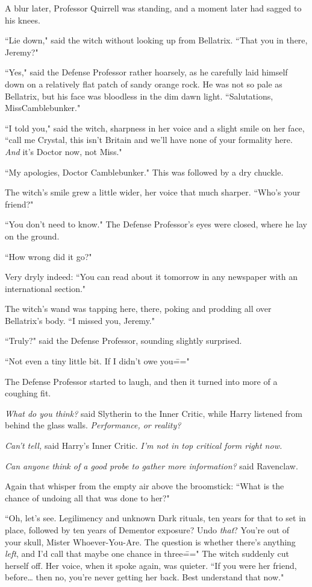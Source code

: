 A blur later, Professor Quirrell was standing, and a moment later had sagged to his knees.

``Lie down," said the witch without looking up from Bellatrix. ``That you in there, Jeremy?"

``Yes," said the Defense Professor rather hoarsely, as he carefully laid himself down on a relatively flat patch of sandy orange rock. He was not so pale as Bellatrix, but his face was bloodless in the dim dawn light. ``Salutations, Miss\?Camblebunker."

``I told you," said the witch, sharpness in her voice and a slight smile on her face, ``call me Crystal, this isn't Britain and we'll have none of your formality here. \emph{And} it's Doctor now, not Miss."

``My apologies, Doctor Camblebunker." This was followed by a dry chuckle.

The witch's smile grew a little wider, her voice that much sharper. ``Who's your friend?"

``You don't need to know." The Defense Professor's eyes were closed, where he lay on the ground.

``How wrong did it go?"

Very dryly indeed: ``You can read about it tomorrow in any newspaper with an international section."

The witch's wand was tapping here, there, poking and prodding all over Bellatrix's body. ``I missed you, Jeremy."

``Truly?" said the Defense Professor, sounding slightly surprised.

``Not even a tiny little bit. If I didn't owe you\==="

The Defense Professor started to laugh, and then it turned into more of a coughing fit.

\emph{What do you think?} said Slytherin to the Inner Critic, while Harry listened from behind the glass walls. \emph{Performance, or reality?}

\emph{Can't tell,} said Harry's Inner Critic. \emph{I'm not in top critical form right now.}

\emph{Can anyone think of a good probe to gather more information?} said Ravenclaw.

Again that whisper from the empty air above the broomstick: ``What is the chance of undoing all that was done to her?"

``Oh, let's see. Legilimency and unknown Dark rituals, ten years for that to set in place, followed by ten years of Dementor exposure? Undo \emph{that}? You're out of your skull, Mister Whoever-You-Are. The question is whether there's anything \emph{left}, and I'd call that maybe one chance in three\===" The witch suddenly cut herself off. Her voice, when it spoke again, was quieter. ``If you were her friend, before{\ldots} then no, you're never getting her back. Best understand that now."


